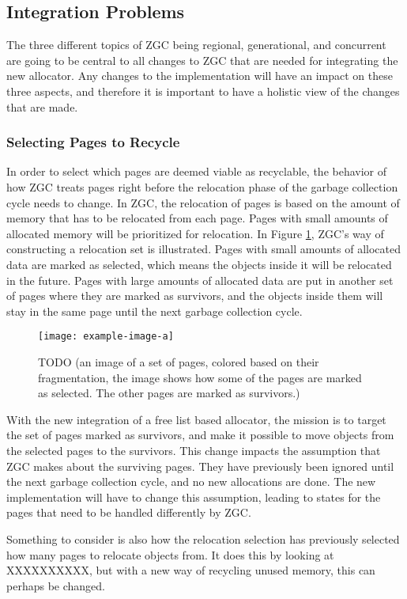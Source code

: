 \subsection{Integration Problems}
The three different topics of ZGC being regional, generational, and concurrent are going to be central to all changes to ZGC that are needed for integrating the new allocator. Any changes to the implementation will have an impact on these three aspects, and therefore it is important to have a holistic view of the changes that are made.
\subsubsection{Selecting Pages to Recycle}
In order to select which pages are deemed viable as recyclable, the behavior of how ZGC treats pages right before the relocation phase of the garbage collection cycle needs to change. In ZGC, the relocation of pages is based on the amount of memory that has to be relocated from each page. Pages with small amounts of allocated memory will be prioritized for relocation. In Figure \ref{fig:rel_set_selector}, ZGC's way of constructing a relocation set is illustrated. Pages with small amounts of allocated data are marked as selected, which means the objects inside it will be relocated in the future. Pages with large amounts of allocated data are put in another set of pages where they are marked as survivors, and the objects inside them will stay in the same page until the next garbage collection cycle. 

\begin{figure}[H]
    \centering
    \texttt{[image: example-image-a]}
    \caption{TODO (an image of a set of pages, colored based on their fragmentation, the image shows how some of the pages are marked as selected. The other pages are marked as survivors.)}
    \label{fig:rel_set_selector}
\end{figure} 


With the new integration of a free list based allocator, the mission is to target the set of pages marked as survivors, and make it possible to move objects from the selected pages to the survivors. This change impacts the assumption that ZGC makes about the surviving pages. They have previously been ignored until the next garbage collection cycle, and no new allocations are done. The new implementation will have to change this assumption, leading to states for the pages that need to be handled differently by ZGC.

Something to consider is also how the relocation selection has previously selected how many pages to relocate objects from. It does this by looking at XXXXXXXXXX, but with a new way of recycling unused memory, this can perhaps be changed.


